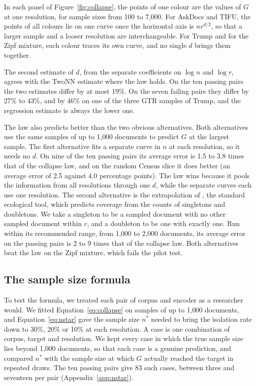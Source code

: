 In each panel of Figure~\ref{fig:collapse}, the points of one colour are the values of $G$ at one resolution, for sample sizes from 100 to 7{,}000. For AskDocs and TIFU, the points of all colours lie on one curve once the horizontal axis is $n r^{d/2}$, so that a larger sample and a looser resolution are interchangeable. For Trump and for the Zipf mixture, each colour traces its own curve, and no single $d$ brings them together.

The second estimate of $d$, from the separate coefficients on $\log n$ and $\log r$, agrees with the TwoNN estimate where the law holds. On the ten passing pairs the two estimates differ by at most 19\%. On the seven failing pairs they differ by 27\% to 43\%, and by 46\% on one of the three GTR samples of Trump, and the regression estimate is always the lower one.

The law also predicts better than the two obvious alternatives. Both alternatives use the same samples of up to 1{,}000 documents to predict $G$ at the largest sample. The first alternative fits a separate curve in $n$ at each resolution, so it needs no $d$. On nine of the ten passing pairs its average error is 1.5 to 3.8 times that of the collapse law, and on the random Census slice it does better (an average error of 2.5 against 4.0 percentage points). The law wins because it pools the information from all resolutions through one $d$, while the separate curves each use one resolution. The second alternative is the extrapolation of \citet{chao2012coverage}, the standard ecological tool, which predicts coverage from the counts of singletons and doubletons. We take a singleton to be a sampled document with no other sampled document within $r$, and a doubleton to be one with exactly one. Run within its recommended range, from 1{,}000 to 2{,}000 documents, its average error on the passing pairs is 2 to 9 times that of the collapse law. Both alternatives beat the law on the Zipf mixture, which fails the pilot test.

\subsection{The sample size formula}
\label{sec:nstar}

To test the formula, we treated each pair of corpus and encoder as a researcher would. We fitted Equation~\ref{eq:collapse} on samples of up to 1{,}000 documents, and Equation~\ref{eq:nstar} gave the sample size $n^{*}$ needed to bring the isolation rate down to 30\%, 20\% or 10\% at each resolution. A case is one combination of corpus, target and resolution. We kept every case in which the true sample size lies beyond 1{,}000 documents, so that each case is a genuine prediction, and compared $n^{*}$ with the sample size at which $G$ actually reached the target in repeated draws. The ten passing pairs give 83 such cases, between three and seventeen per pair (Appendix~\ref{app:nstar}).

